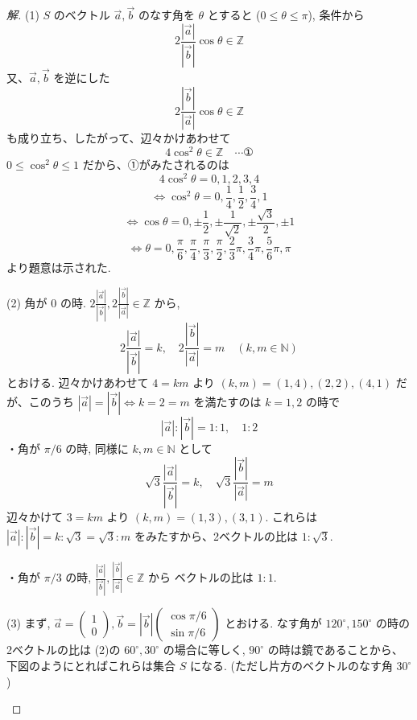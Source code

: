 \documentclass[../main.tex]{subfiles}
\begin{document}
\begin{proof}[解]
  (1) $S$ のベクトル $\vec{a}, \vec{b}$ のなす角を $\theta$ とすると ($0 \le \theta \le \pi$), 条件から
  \[
    2 \frac{|\vec{a}|}{|\vec{b}|} \cos\theta \in \mathbb{Z}
  \]
  又、$\vec{a}, \vec{b}$ を逆にした
  \[
    2 \frac{|\vec{b}|}{|\vec{a}|} \cos\theta \in \mathbb{Z}
  \]
  も成り立ち、したがって、辺々かけあわせて
  \[
    4 \cos^2\theta \in \mathbb{Z} \quad \cdots \text{①}
  \]
  $0 \le \cos^2\theta \le 1$ だから、①がみたされるのは
  \[
    4 \cos^2\theta = 0, 1, 2, 3, 4
  \]
  \[
    \iff \cos^2\theta = 0, \frac{1}{4}, \frac{1}{2}, \frac{3}{4}, 1
  \]
  \[
    \iff \cos\theta = 0, \pm \frac{1}{2}, \pm \frac{1}{\sqrt{2}}, \pm \frac{\sqrt{3}}{2}, \pm 1
  \]
  \[
    \iff \theta = 0, \frac{\pi}{6}, \frac{\pi}{4}, \frac{\pi}{3}, \frac{\pi}{2}, \frac{2}{3}\pi, \frac{3}{4}\pi, \frac{5}{6}\pi, \pi
  \]
  より題意は示された.

  \medskip
  (2) 角が $0$ の時. $2 \frac{|\vec{a}|}{|\vec{b}|}, 2 \frac{|\vec{b}|}{|\vec{a}|} \in \mathbb{Z}$ から,
  \[
    2 \frac{|\vec{a}|}{|\vec{b}|} = k, \quad 2 \frac{|\vec{b}|}{|\vec{a}|} = m \quad (k, m \in \mathbb{N})
  \]
  とおける. 辺々かけあわせて $4 = km$ より $(k, m) = (1, 4), (2, 2), (4, 1)$ だが、このうち $|\vec{a}| = |\vec{b}| \iff k = 2 = m$ を満たすのは $k=1, 2$ の時で
  \[
    |\vec{a}| : |\vec{b}| = 1 : 1, \quad 1 : 2
  \]
  ・角が $\pi/6$ の時, 同様に $k, m \in \mathbb{N}$ として
  \[
    \sqrt{3} \frac{|\vec{a}|}{|\vec{b}|} = k, \quad \sqrt{3} \frac{|\vec{b}|}{|\vec{a}|} = m
  \]
  辺々かけて $3 = km$ より $(k, m) = (1, 3), (3, 1)$. これらは $|\vec{a}| : |\vec{b}| = k : \sqrt{3} = \sqrt{3} : m$ をみたすから、2ベクトルの比は $1 : \sqrt{3}$.

  ・角が $\pi/3$ の時, $\frac{|\vec{a}|}{|\vec{b}|}, \frac{|\vec{b}|}{|\vec{a}|} \in \mathbb{Z}$ から ベクトルの比は $1 : 1$.

  \medskip
  (3) まず, $\vec{a} =
  \begin{pmatrix} 1 \\ 0
  \end{pmatrix}, \vec{b} = |\vec{b}|
  \begin{pmatrix} \cos \pi/6 \\ \sin \pi/6
  \end{pmatrix}$ とおける. なす角が $120^\circ, 150^\circ$ の時の2ベクトルの比は (2)の $60^\circ, 30^\circ$ の場合に等しく, $90^\circ$ の時は鏡であることから、下図のようにとればこれらは集合 $S$ になる. (ただし片方のベクトルのなす角 $30^\circ$)

  \begin{center}
\end{center}
\end{proof}
\end{document}
